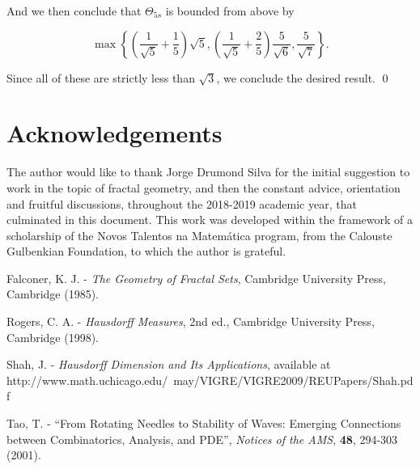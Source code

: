 \documentclass[11pt, reqno]{amsart}
\begin{document}
And we then conclude that $\Theta_{5s}$ is bounded from above by

\[ \max \left\{ \left(\frac 1 {\sqrt{5}} + \frac 1 5\right) \sqrt 5, \left(\frac 1 {\sqrt{5}} + \frac 2 5\right) \frac 5 {\sqrt 6}, \frac 5 {\sqrt 7} \right\}.\]

Since all of these are strictly less than $\sqrt 3$, we conclude the desired result. \qed

\section{Acknowledgements}

The author would like to thank Jorge Drumond Silva for the initial suggestion to work in the topic of fractal geometry, and then the constant advice, orientation and fruitful discussions, throughout the 2018-2019 academic year, that culminated in this document. This work was developed within the framework of a scholarship of the Novos Talentos na Matemática program, from the Calouste Gulbenkian Foundation, to which the author is grateful. 


\begin{thebibliography}{1}
Falconer, K. J. - \textit{The Geometry of Fractal Sets}, Cambridge University Press, Cambridge (1985).

Rogers, C. A. - \textit{Hausdorff Measures}, 2nd ed., Cambridge University Press, Cambridge (1998).

Shah, J. - \textit{Hausdorff Dimension and Its Applications}, available at http://www.math.uchicago.edu/~may/VIGRE/VIGRE2009/REUPapers/Shah.pdf

Tao, T. - ``From Rotating Needles to Stability of Waves: Emerging Connections between Combinatorics, Analysis, and PDE'', \textit{Notices of the AMS}, \textbf{48}, 294-303 (2001).

\end{thebibliography}
\end{document}

